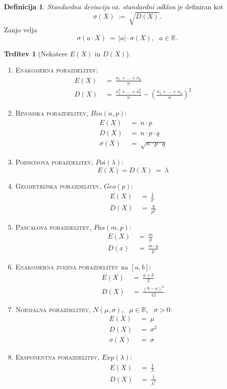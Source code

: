 \documentclass[11pt]{article}
\theoremstyle{definition}
\newtheorem{definicija}{Definicija}[section]
\theoremstyle{definition}
\newtheorem{trditev}{Trditev}[section]
\theoremstyle{definition}
\begin{document}
\begin{definicija}

\textit{Standardna deviacija} oz. \textit{standardni odklon} je definiran kot
$$\sigma(X) ~:=~ \sqrt{D(X)}.$$
Zanjo velja
$$\sigma(a \cdot X) ~=~ |a| \cdot \sigma(X), ~~~a \in \mathbb{R}.$$

\end{definicija}
\vspace{0.5cm}

\begin{trditev}[Nekatere $E(X)$ in $D(X)$]
~
\begin{enumerate}
	\item \textsc{Enakomerna porazdelitev}:
	\begin{align*}
	E(X) ~&=~ \frac{x_1 + \ldots + x_n}{n} \\
	D(X) ~&=~ \frac{x_1^2 + \ldots + x_n^2}{n} - \left( \frac{x_1 + \ldots + x_n}{n} \right)^2
	\end{align*}
	\item \textsc{Binomska porazdelitev}, $Bin(n, p)$:
	\begin{align*}
	E(X) ~&=~ n \cdot p \\
	D(X) ~&=~ n \cdot p \cdot q \\
	\sigma(X) ~&=~ \sqrt{n \cdot p \cdot q}
	\end{align*}
	\item \textsc{Poissonova porazdelitev}, $Poi(\lambda)$:
	$$E(X) = D(X) ~=~ \lambda$$
	\item \textsc{Geometrijska porazdelitev}, $Geo(p)$:
	\begin{align*}
	E(X) ~&=~ \frac{1}{p} \\
	D(X) ~&=~ \frac{q}{p^2}
	\end{align*}
	\item \textsc{Pascalova porazdelitev}, $Pas(m, p)$:
	\begin{align*}
	E(X) ~&=~ \frac{m}{p} \\
	D(x) ~&=~ \frac{m \cdot q}{p}
	\end{align*}
	\item \textsc{Enakomerna zvezna porazdelitev} na $[a, b]$:
	\begin{align*}
	E(X) ~&=~ \frac{a + b}{2} \\
	D(X) ~&=~ \frac{(b-a)^2}{12}
	\end{align*}
	\item \textsc{Normalna porazdelitev}, $N(\mu, \sigma)$, ~$\mu \in \mathbb{R}$, ~$\sigma > 0$:
	\begin{align*}
	E(X) ~&=~ \mu \\
	D(X) ~&=~ \sigma^2 \\
	\sigma(X) ~&=~ \sigma
	\end{align*}
	\item \textsc{Eksponentna porazdelitev}, $Exp(\lambda)$:
	\begin{align*}
	E(X) ~&=~ \frac{1}{\lambda} \\
	D(X) ~&=~ \frac{1}{\lambda^2}
	\end{align*}
\end{enumerate}

\end{trditev}
\vspace{0.5cm}
\end{document}
